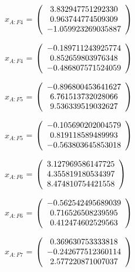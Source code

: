 \begin{description}
$x_{A:F4}$  = $\left( \begin{array} {ccc} 3.832947751292330 \\ 0.963744774509309 \\ -1.059923269035887
\end{array} \right)\\ \\$

$\hat{x}_{A:F4}$  = $\left( \begin{array} {ccc} -0.189711243925774 \\ 0.852659803976348 \\ -0.486807571524059
\end{array} \right)\\ \\$

$x_{A:F5}$  = $\left( \begin{array} {ccc} -0.896800453641627 \\ 6.761513732028066 \\ 9.536339519032627
\end{array} \right)\\ \\$

$\hat{x}_{A:F5}$  = $\left( \begin{array} {ccc} -0.105690202004579 \\ 0.819118589489993 \\ -0.563803645853018
\end{array} \right)\\ \\$

$x_{A:F6}$  = $\left( \begin{array} {ccc} 3.127969586147725 \\ 4.355819180534397 \\ 8.474810754421558
\end{array} \right)\\ \\$

$\hat{x}_{A:F6}$  = $\left( \begin{array} {ccc} -0.562542495689039 \\ 0.716526508239595 \\ 0.412474602529563
\end{array} \right)\\ \\$

$x_{A:F7}$  = $\left( \begin{array} {ccc} 0.369630753333818 \\ -0.242677512360114 \\ 2.577220871007037
\end{array} \right)\\ \\$


\end{description}
